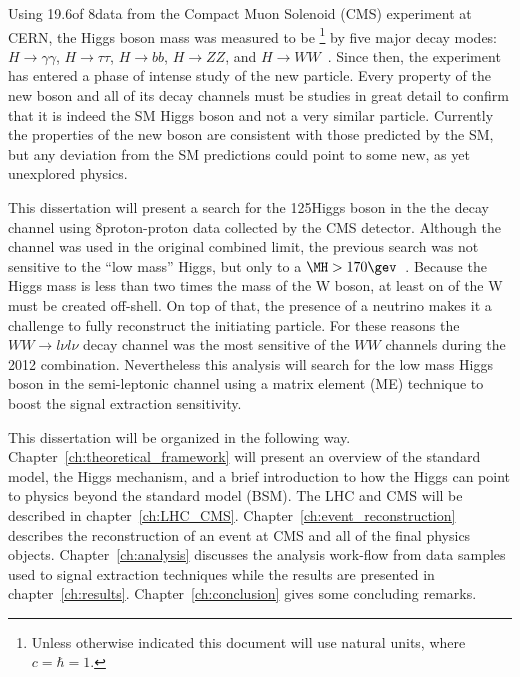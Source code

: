 Using 19.6\fbinv of 8\tev data from the Compact Muon Solenoid (CMS) experiment at CERN, the Higgs boson mass was measured to be \footnote{Unless otherwise indicated this document will use natural units, where $c=\hbar=1$.} by five major decay modes: $H\rightarrow\gamma\gamma$, $H\rightarrow\tau\tau$, $H\rightarrow{bb}$, $H\rightarrow{ZZ}$, and $H\rightarrow{WW}$~\cite{CMS-PAS-HIG-13-005}.
Since then, the experiment has entered a phase of intense study of the new particle.
Every property of the new boson and all of its decay channels must be studies in great detail to confirm that it is indeed the SM Higgs boson and not a very similar particle.
Currently the properties of the new boson are consistent with those predicted by the SM, but any deviation from the SM predictions could point to some new, as yet unexplored physics.

This dissertation will present a search for the 125\gev Higgs boson in the the \HWWlnujj decay channel using 8\tev proton-proton data collected by the CMS detector.
Although the \HWWlnujj channel was used in the original combined limit, the previous search was not sensitive to the ``low mass'' Higgs, but only to a $\MH>170\gev$~\cite{CMS-PAS-HIG-13-027}.
Because the Higgs mass is less than two times the mass of the W boson, at least on of the W must be created off-shell.
On top of that, the presence of a neutrino makes it a challenge to fully reconstruct the initiating particle.
For these reasons the $WW\rightarrow{l\nu}{l\nu}$ decay channel was the most sensitive of the $WW$ channels during the 2012 combination.
Nevertheless this analysis will search for the low mass Higgs boson in the semi-leptonic channel using a matrix element (ME) technique to boost the signal extraction sensitivity.

This dissertation will be organized in the following way.
Chapter~\ref{ch:theoretical_framework} will present an overview of the standard model, the Higgs mechanism, and a brief introduction to how the Higgs can point to physics beyond the standard model (BSM).
The LHC and CMS will be described in chapter~\ref{ch:LHC_CMS}.
Chapter~\ref{ch:event_reconstruction} describes the reconstruction of an event at CMS and all of the final physics objects.
Chapter~\ref{ch:analysis} discusses the analysis work-flow from data samples used to signal extraction techniques while the results are presented in chapter~\ref{ch:results}.
Chapter~\ref{ch:conclusion} gives some concluding remarks.

